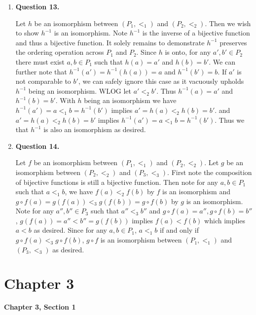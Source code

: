 \documentclass{article}
\begin{document}
\begin{enumerate}
	 \newpage
	 \item \textbf{Question 13.} 
	 \medskip
	 
	 Let $h$ be an isomorphism between $(P_1, <_{1})$ and $(P_2, <_{2})$. Then we wish to show $h^{-1}$ is an isomorphism. Note $h^{-1}$ is the inverse of a bijective function and thus a bijective function. It solely remains to demonstrate $h^{-1}$ preserves the ordering operation across $P_1$ and $P_2$. Since $h$ is onto, for any $a',b' \in P_2$ there must exist $a,b \in P_1$ such that $h(a) = a'$ and $h(b) = b'$. We can further note that $h^{-1}(a') = h^{-1}(h(a)) = a$ and $h^{-1}(b') = b$.  If $a'$ is not comparable to $b'$, we can safely ignore this case as it vacuously upholds $h^{-1}$ being an isomorphism. WLOG let $a' <_{2} b'$. Thus $h^{-1}(a) = a'$ and $h^{-1}(b) = b'$. With $h$ being an isomorphism we have $h^{-1}(a') = a <_{1} b = h^{-1}(b')$ implies $a' = h(a) <_{2} h(b) = b'$. and $a' = h(a) <_{2} h(b) = b'$ implies $h^{-1}(a') = a <_{1} b = h^{-1}(b')$. Thus we that $h^{-1}$ is also an isomorphism as desired.
	 
	 \item \textbf{Question 14.}
	 \medskip
	 
	  Let $f$ be an isomorphism between $(P_1, <_{1})$ and $(P_2, <_{2})$.  Let $g$ be an isomorphism between $(P_2, <_{2})$ and $(P_3, <_{3})$. First note the composition of bijective functions is still a bijective function. Then note for any $a,b \in P_1$ such that $a <_{1} b$, we have $f(a) <_{2} f(b)$ by $f$ is an isomorphism and $g \circ f(a) = g(f(a)) <_{3} g(f(b)) = g \circ f(b)$ by $g$ is an isomorphism. Note for any $a'',b'' \in P_3$ such that $a'' <_{3} b''$ and $g \circ f(a) = a'', g \circ f(b) = b''$, $g(f(a)) = a'' < b'' = g(f(b))$ implies $f(a) < f(b)$ which implies $a < b$ as desired. Since for any $a, b \in P_1$, $a <_{1} b$ if and only if $g \circ f(a) <_{3} g \circ f(b)$, $g \circ f$ is an isomorphism between $(P_1, <_{1})$ and $(P_3, <_{3})$ as desired.

\end{enumerate}

\section{Chapter 3}

\medskip
\textbf{Chapter 3, Section 1}
\medskip
\end{document}
